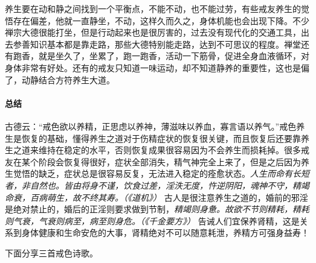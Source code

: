 养生要在动和静之间找到一个平衡点，不能不动，也不能过劳，有些戒友养生的觉悟存在偏差，他就一直静坐，不动，这样久而久之，身体机能也会出现下降。不少禅宗大德很能打坐，但是行动起来也是很厉害的，过去没有现代化的交通工具，出去参善知识基本都是靠走路，那些大德特别能走路，达到不可思议的程度。禅堂还有跑香，就是坐久了，坐累了，跑一跑香，活动一下筋骨，促进全身血液循环，对身体非常有好处。还有的戒友只知道一味运动，却不知道静养的重要性，这也是偏了，动静结合方符养生大道。

\paragraph*{总结}

古德云：“戒色欲以养精，正思虑以养神，薄滋味以养血，寡言语以养气。”戒色养生是恢复的基础，懂得养生之道对于伤精症状的恢复很关键，而且恢复后还要靠养生之道来维持在稳定的水平，否则恢复成果很容易因为不会养生而损耗掉。很多戒友在某个阶段会恢复得很好，症状全部消失，精气神完全上来了，但是之后因为养生觉悟的缺乏，症状总是很容易反复，无法进入稳定的痊愈状态。\textit{人生而命有长短者，非自然也。皆由将身不谨，饮食过差，淫泆无度，忤逆阴阳，魂神不守，精竭命衰，百病萌生，故不终其寿。（《道机》）} 古人是很注意养生之道的，婚前的邪淫是绝对禁止的，婚后的正淫则要求做到节制，\textit{精竭则身惫。故欲不节则精耗，精耗则气衰，气衰则病至，病至则身危。（《千金要方》）} 告诫人们宜保养肾精，这是关系到身体健康和生命安危的大事，肾精绝对不可以随意耗泄，养精方可强身益寿！

下面分享三首戒色诗歌。

